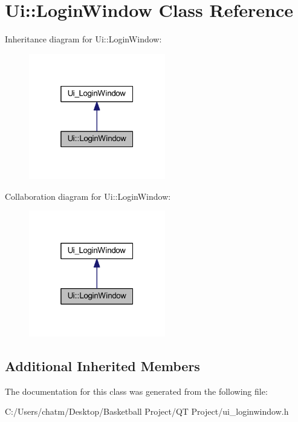 \hypertarget{class_ui_1_1_login_window}{}\section{Ui\+::Login\+Window Class Reference}
\label{class_ui_1_1_login_window}


Inheritance diagram for Ui\+::Login\+Window\+:\nopagebreak
\begin{figure}[H]
\begin{center}
\leavevmode
\includegraphics[width=169pt]{class_ui_1_1_login_window__inherit__graph}
\end{center}
\end{figure}


Collaboration diagram for Ui\+::Login\+Window\+:\nopagebreak
\begin{figure}[H]
\begin{center}
\leavevmode
\includegraphics[width=169pt]{class_ui_1_1_login_window__coll__graph}
\end{center}
\end{figure}
\subsection*{Additional Inherited Members}


The documentation for this class was generated from the following file\+:\begin{DoxyCompactItemize}
\item 
C\+:/\+Users/chatm/\+Desktop/\+Basketball Project/\+Q\+T Project/ui\+\_\+loginwindow.\+h\end{DoxyCompactItemize}
